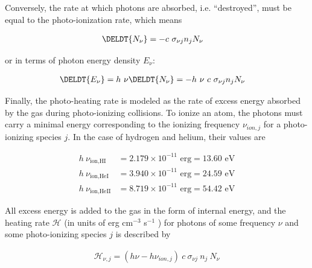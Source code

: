 Conversely, the rate at which photons are absorbed, i.e. ``destroyed'',  must be equal to the
photo-ionization rate, which means

\begin{align}
\DELDT{N_\nu} &= -c \ \sigma_{\nu j} n_j N_\nu
\end{align}

or in terms of photon energy density $E_\nu$:

\begin{align}
\DELDT{E_\nu} &= h \ \nu \DELDT{N_\nu}  = -h\ \nu \ c \ \sigma_{\nu j} n_j N_\nu
\end{align}



Finally, the photo-heating rate is modeled as the rate of excess energy absorbed by the gas during
photo-ionizing collisions. To ionize an atom, the photons must carry a minimal energy corresponding
to the ionizing frequency  $\nu_{ion,j}$ for a photo-ionizing species $j$. In the case of hydrogen
and helium, their values are

\begin{align}
    h\ \nu_{\text{ion,HI}} &= 2.179 \times 10^{-11} \text{ erg} = 13.60 \text{ eV} \label{eq:nuIonHI}\\
    h\ \nu_{\text{ion,HeI}} &= 3.940 \times 10^{-11} \text{ erg} = 24.59 \text{ eV}
\label{eq:nuIonHeI}\\
    h\ \nu_{\text{ion,HeII}} &= 8.719 \times 10^{-11} \text{ erg} = 54.42 \text{ eV}
\label{eq:nuIonHeII}
\end{align}

All excess energy is added to the gas in the form of internal energy, and the heating rate
$\mathcal{H}$ (in units of erg cm$^{-3}$ s$^{-1}$ ) for photons of some frequency $\nu$ and some
photo-ionizing species $j$ is described by

\begin{align}
\mathcal{H}_{\nu, j} = (h \nu - h \nu_{ion,j}) \ c \ \sigma_{\nu j} \ n_j \ N_\nu
\end{align}
